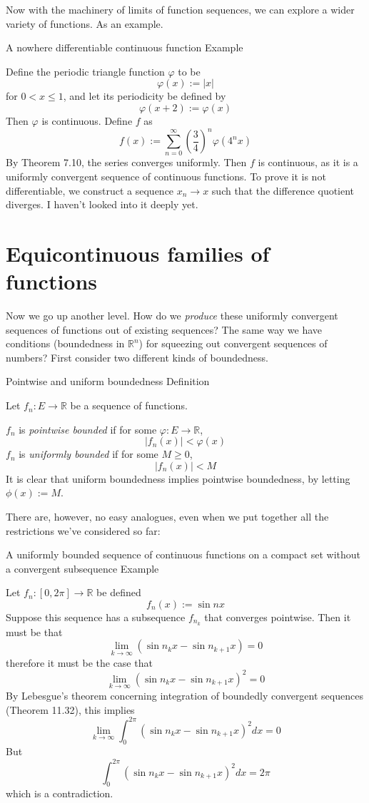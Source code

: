 Now with the machinery of limits of function sequences, we can explore a wider variety of functions. As an example.

\begin{result}
    {A nowhere differentiable continuous function}
    {Example}

    Define the periodic triangle function $\varphi$ to be
    \[\varphi(x) := |x|\]
    for $0 < x \leq 1$, and let its periodicity be defined by
    \[\varphi(x+2) := \varphi(x)\] 
    Then $\varphi$ is continuous. Define $f$ as
    \[f(x) := \sum_{n=0}^\infty \left(\frac{3}{4}\right)^n \varphi(4^nx)\]
    By Theorem 7.10, the series converges uniformly. Then $f$ is continuous, as it is a uniformly convergent sequence of continuous functions.
     To prove it is not differentiable, we construct a sequence $x_n \rightarrow x$ such that the difference quotient diverges. I haven't looked into it deeply yet.
 \end{result}


\section{Equicontinuous families of functions}

Now we go up another level. How do we \textit{produce} these uniformly convergent sequences of functions out of existing sequences? The same way we have conditions (boundedness in $\mathbb{R}^n$) for squeezing out convergent sequences of numbers? First consider two different kinds of boundedness.

\begin{result}
    {Pointwise and uniform boundedness}
    {Definition}
    
    Let $f_n: E \rightarrow \mathbb{R}$ be a sequence of functions.

    $f_n$ is \textit{pointwise bounded} if for some $\varphi: E \rightarrow \mathbb{R}$,
    \[|f_n(x)| < \varphi(x)\]
    $f_n$ is \textit{uniformly bounded} if for some $M \geq 0$,
    \[|f_n(x)| < M\]
    It is clear that uniform boundedness implies pointwise boundedness, by letting $\phi(x) := M$.
\end{result}

There are, however, no easy analogues, even when we put together all the restrictions we've considered so far:

\begin{result}
    {A uniformly bounded sequence of continuous functions on a compact set without a convergent subsequence}
    {Example}

    Let $f_n: [0, 2\pi] \to \mathbb{R}$ be defined 
    \[f_n(x) := \sin nx\]
    Suppose this sequence has a subsequence $f_{n_k}$ that converges pointwise. Then it must be that
    \[\lim_{k \to \infty} (\sin n_k x - \sin n_{k+1}x) = 0\]
    therefore it must be the case that
    \[\lim_{k \to \infty} (\sin n_k x - \sin n_{k+1}x)^2 = 0\]
    By Lebesgue's theorem concerning integration of boundedly convergent sequences (Theorem 11.32), this implies
    \[\lim_{k \to \infty} \int_0^{2\pi} (\sin n_k x - \sin n_{k+1} x)^2 dx = 0\]
    But 
    \[\int_0^{2\pi} (\sin n_k x - \sin n_{k+1} x)^2 dx = 2\pi\]
    which is a contradiction.
\end{result}

